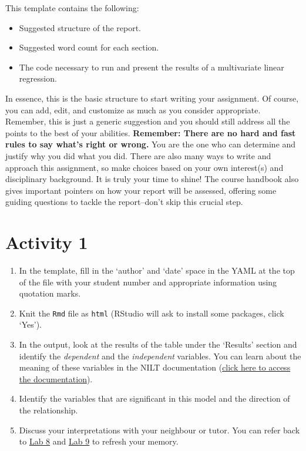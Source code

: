 \documentclass[
]{book}
\providecommand{\tightlist}{%
  \setlength{\itemsep}{0pt}\setlength{\parskip}{0pt}}
\begin{document}
This template contains the following:

\begin{itemize}
\tightlist
\item
  Suggested structure of the report.
\item
  Suggested word count for each section.
\item
  The code necessary to run and present the results of a multivariate linear regression.
\end{itemize}

In essence, this is the basic structure to start writing your assignment. Of course, you can add, edit, and customize as much as you consider appropriate. Remember, this is just a generic suggestion and you should still address all the points to the best of your abilities. \textbf{Remember: There are no hard and fast rules to say what's right or wrong.} You are the one who can determine and justify why you did what you did. There are also many ways to write and approach this assignment, so make choices based on your own interest(s) and disciplinary background. It is truly your time to shine! The course handbook also gives important pointers on how your report will be assessed, offering some guiding questions to tackle the report--don't skip this crucial step.

\hypertarget{activity-1-3}{%
\section{Activity 1}\label{activity-1-3}}

\begin{enumerate}
\def\labelenumi{\arabic{enumi}.}
\tightlist
\item
  In the template, fill in the `author' and `date' space in the YAML at the top of the file with your student number and appropriate information using quotation marks.
\item
  Knit the \texttt{Rmd} file as \texttt{html} (RStudio will ask to install some packages, click `Yes').
\item
  In the output, look at the results of the table under the `Results' section and identify the \emph{dependent} and the \emph{independent} variables. You can learn about the meaning of these variables in the NILT documentation (\href{https://www.ark.ac.uk/teaching/NILT2012TeachingResources.pdf}{click here to access the documentation}).
\item
  Identify the variables that are significant in this model and the direction of the relationship.
\item
  Discuss your interpretations with your neighbour or tutor. You can refer back to \protect\hyperlink{simple-lm}{Lab 8} and \protect\hyperlink{multi-lm}{Lab 9} to refresh your memory.
\end{enumerate}
\end{document}
